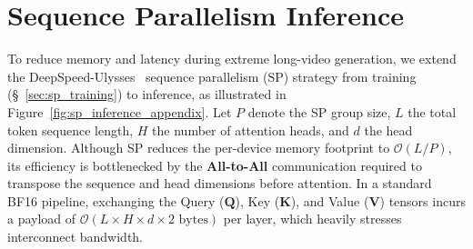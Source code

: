 \documentclass{llmxive}
\begin{document}
\section{Sequence Parallelism Inference}\label{ap:sp_inference}

To reduce memory and latency during extreme long-video generation, we extend the DeepSpeed-Ulysses~\cite{jacobs2023deepspeed} sequence parallelism (SP) strategy from training (\S~\ref{sec:sp_training}) to inference, as illustrated in Figure~\ref{fig:sp_inference_appendix}. Let $P$ denote the SP group size, $L$ the total token sequence length, $H$ the number of attention heads, and $d$ the head dimension. Although SP reduces the per-device memory footprint to $\mathcal{O}(L/P)$, its efficiency is bottlenecked by the \textbf{All-to-All} communication required to transpose the sequence and head dimensions before attention. In a standard BF16 pipeline, exchanging the Query ($\mathbf{Q}$), Key ($\mathbf{K}$), and Value ($\mathbf{V}$) tensors incurs a payload of $\mathcal{O}(L \times H \times d \times 2 \text{ bytes})$ per layer, which heavily stresses interconnect bandwidth.
\end{document}

